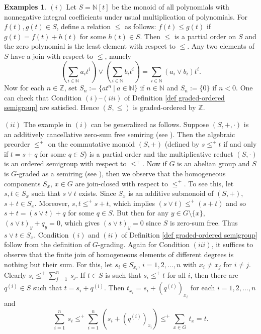 \documentclass[a4paper,reqno,11pt]{amsart}
\numberwithin{equation}{section}
\theoremstyle{definition}
\newtheorem{examples}[thm]{Examples}
\theoremstyle{remark}
\begin{document}
\begin{examples}\label{ex graded-ordered semigroup}
$(i)$ Let $S=\mathbb{N}[t]$ be the monoid of all polynomials with nonnegative integral coefficients under usual multiplication of polynomials. For $f(t),g(t)\in S$, define a relation $\leqslant$ as follows: $f(t)\leqslant g(t)$ if $g(t)=f(t)+h(t)$ for some $h(t)\in S$. Then $\leqslant$ is a partial order on $S$ and the zero polynomial is the least element with respect to $\leqslant$. Any two elements of $S$ have a join with respect to $\leqslant$, namely \[\left(\displaystyle{\sum_{i\in \mathbb{N}}}a_i t^i\right)\vee \left(\displaystyle{\sum_{i\in \mathbb{N}}}b_i t^i\right)=\displaystyle{\sum_{i\in \mathbb{N}}}(a_i\vee b_i)t^i.\] Now for each $n\in \mathbb{Z}$, set $S_n:=\{at^n~|~a\in \mathbb{N}\}$ if $n\in \mathbb{N}$ and $S_n:=\{0\}$ if $n<0$. One can check that Condition $(i)$--$(iii)$ of Definition \ref{def graded-ordered semigroup} are satisfied. Hence $(S,\leqslant)$ is graded-ordered by $\mathbb{Z}$.

$(ii)$ The example in $(i)$ can be generalized as follows. Suppose $(S,+,\cdot)$ is an additively cancellative zero-sum free semiring (see \cite{Golan}). Then the algebraic preorder $\le^+$ on the commutative monoid $(S,+)$ (defined by $s\le^+ t$ if and only if $t=s+q$ for some $q\in S$) is a partial order and the multiplicative reduct $(S,\cdot)$ is an ordered semigroup with respect to $\le^+$. Now if $G$ is an abelian group and $S$ is $G$-graded as a semiring (see \cite[Definition 2.4]{MNS}), then we observe that the homogeneous components $S_x$, $x\in G$ are join-closed with respect to $\le^+$. To see this, let $s,t\in S_x$ such that $s\vee t$ exists. Since $S_x$ is an additive submonoid of $(S,+)$, $s+t\in S_x$. Moreover, $s,t\le^+ s+t$, which implies $(s\vee t)\le^+(s+t)$ and so $s+t=(s\vee t)+q$ for some $q\in S$. But then for any $y\in G\setminus \{x\}$, $(s\vee t)_y+q_y=0$, which gives $(s\vee t)_y=0$ since $S$ is zero-sum free. Thus $s\vee t\in S_x$. Condition $(i)$ and $(ii)$ of Definition \ref{def graded-ordered semigroup} follow from the definition of $G$-grading. Again for Condition $(iii)$, it suffices to observe that the finite join of homogeneous elements of different degrees is nothing but their sum. For this, let $s_i\in S_{x_i}$, $i=1,2,\ldots,n$ with $x_i\neq x_j$ for $i\neq j$. Clearly $s_i\le^+ \displaystyle{\sum_{j=1}^{n}}~s_j$. If $t\in S$ is such that $s_i\le^+ t$ for all $i$, then there are $q^{(i)}\in S$ such that $t=s_i+q^{(i)}$. Then $t_{x_i}=s_i+(q^{(i)})_{x_i}$ for each $i=1,2,\ldots,n$ and \[\displaystyle{\sum_{i=1}^{n}}~s_i\le^+ \displaystyle{\sum_{i=1}^{n}}~\left(s_i+(q^{(i)})_{x_i}\right)\le^+ \displaystyle{\sum_{x\in G}}~t_x=t.\] 


\end{examples}
\end{document}
